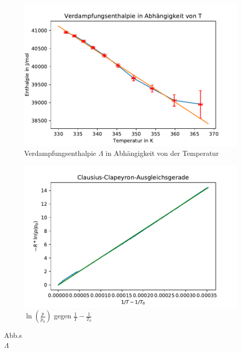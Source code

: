 \documentclass[]{article}
\begin{document}
	\begin{figure}
		\begin{center}
			\includegraphics[scale=0.9]{Images/Dampfdruck_L.pdf}
			\caption{Verdampfungsenthalpie $\Lambda$ in Abhängigkeit von der Temperatur}
			\label{DD_L(T)}
		\end{center}
	\end{figure}
	
	\begin{figure}
		\begin{center}
			\includegraphics[scale=0.9]{Images/Dampfdruck_ln.pdf}
			\caption{$\ln(\frac{p}{p_0})$ gegen $\frac{1}{T} - \frac{1}{T_0}$}
			\label{DD_ln-1}
		\end{center}
	\end{figure}
	
	Abb.s\\
	$\Lambda$\\ 
\end{document}
